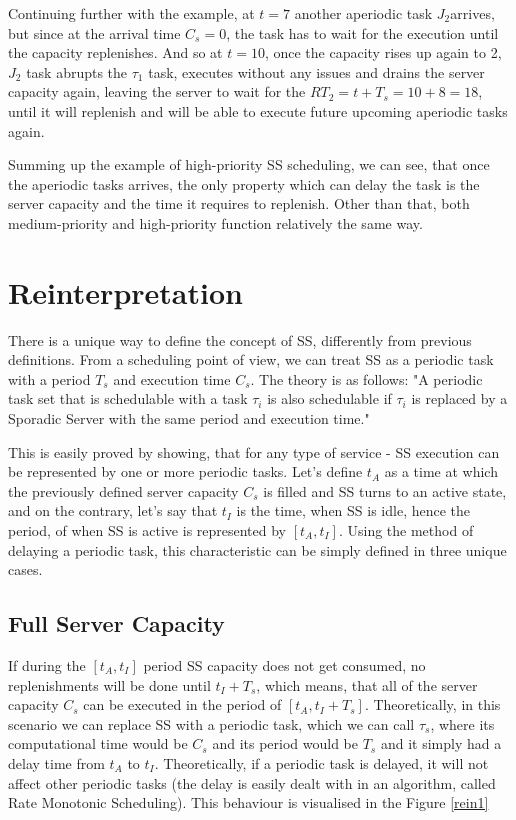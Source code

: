 \documentclass[conference]{IEEEtran}
\begin{document}
Continuing further with the example, at $t = 7$ another aperiodic task $J_2$arrives, but since at the arrival time $C_s = 0$, the task has to wait for the execution until the capacity replenishes. And so at $t = 10$, once the capacity rises up again to 2, $J_2$ task abrupts the $\tau_1$ task, executes without any issues and drains the server capacity again, leaving the server to wait for the $RT_2 = t + T_s = 10 + 8 = 18$, until it will replenish and will be able to execute future upcoming aperiodic tasks again.

Summing up the example of high-priority SS scheduling, we can see, that once the aperiodic tasks arrives, the only property which can delay the task is the server capacity and the time it requires to replenish. Other than that, both medium-priority and high-priority function relatively the same way.

\section{Reinterpretation}

There is a unique way to define the concept of SS, differently from previous definitions. From a scheduling point of view, we can treat SS as a periodic task with a period $T_s$ and execution time $C_s$. The theory is as follows: "A periodic task set that is schedulable with a task $τ_i$ is also schedulable if $τ_i$ is replaced by a Sporadic Server with the same period and execution time." \cite{b1}

This is easily proved by showing, that for any type of service - SS execution can be represented by one or more periodic tasks. Let's define $t_A$ as a time at which the previously defined server capacity $C_s$ is filled and SS turns to an active state, and on the contrary, let's say that $t_I$ is the time, when SS is idle, hence the period, of when SS is active is represented by $[t_A,t_I ]$.  Using the method of delaying a periodic task, this characteristic can be simply defined in three unique cases.

\subsection{Full Server Capacity}

If during the $[t_A,t_I ]$ period SS capacity does not get consumed, no replenishments will be done until $t_I + T_s$, which means, that all of the server capacity $C_s$ can be executed in the period of  $[t_A,t_I  + T_s]$. Theoretically, in this scenario we can replace SS with a periodic task, which we can call $\tau_s$, where its computational time would be $C_s$ and its period would be $T_s$ and it simply had a delay time from $t_A$ to $t_I$. Theoretically, if a periodic task is delayed, it will not affect other periodic tasks (the delay is easily dealt with in an algorithm, called Rate Monotonic Scheduling). This behaviour is visualised in the Figure \ref{rein1}
\end{document}
